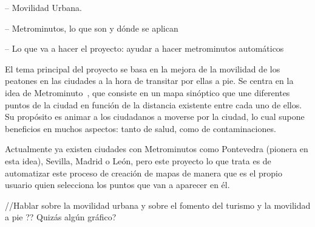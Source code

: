 -- Movilidad Urbana.



-- Metrominutos, lo que son y dónde se aplican




-- Lo que va a hacer el proyecto: ayudar a hacer metrominutos automáticos


El tema principal del proyecto se basa en la mejora de la movilidad de los peatones en las ciudades a la hora de transitar por ellas a pie. Se centra en la idea de Metrominuto~\cite{metrominuto}, que consiste en un mapa sinóptico que une diferentes puntos de la ciudad en función de la distancia existente entre cada uno de ellos. Su propósito es animar a los ciudadanos a moverse por la ciudad, lo cual supone beneficios en muchos aspectos: tanto de salud, como de contaminaciones.

Actualmente ya existen ciudades con Metrominutos como Pontevedra (pionera en esta idea), Sevilla, Madrid o León, pero este proyecto lo que trata es de automatizar este proceso de creación de mapas de manera que es el propio usuario quien selecciona los puntos que van a aparecer en él.

//Hablar sobre la movilidad urbana y sobre el fomento del turismo y la movilidad a pie ?? Quizás algún gráfico?


